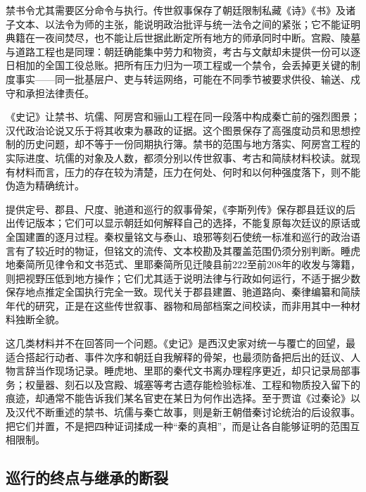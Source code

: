 禁书令尤其需要区分命令与执行。传世叙事保存了朝廷限制私藏《诗》《书》及诸子文本、以法令为师的主张，能说明政治批评与统一法令之间的紧张；它不能证明典籍在一夜间焚尽，也不能让后世据此断定所有地方的师承同时中断。宫殿、陵墓与道路工程也是同理：朝廷确能集中劳力和物资，考古与文献却未提供一份可以逐日相加的全国工役总账。把所有压力归为一项工程或一个禁令，会丢掉更关键的制度事实——同一批基层户、吏与转运网络，可能在不同季节被要求供役、输送、戍守和承担法律责任。

\begin{debate}[诏令、传说与执行]
《史记》让禁书、坑儒、阿房宫和骊山工程在同一段落中构成秦亡前的强烈图景；汉代政治论说又乐于将其收束为暴政的证据。这个图景保存了高强度动员和思想控制的历史问题，却不等于一份同期执行簿。禁书的范围与地方落实、阿房宫工程的实际进度、坑儒的对象及人数，都须分别以传世叙事、考古和简牍材料校读。就现有材料而言，压力的存在较为清楚，压力在何处、何时和以何种强度落下，则不能伪造为精确统计。
\end{debate}

\begin{sourcenote}[从皇帝诏令到县廷竹简]
提供定号、郡县、尺度、驰道和巡行的叙事骨架，《李斯列传》保存郡县廷议的后出传记版本；它们可以显示朝廷如何解释自己的选择，不能复原每次廷议的原话或全国建置的逐月过程。秦权量铭文与泰山、琅邪等刻石使统一标准和巡行的政治语言有了较近时的物证，但铭文的流传、文本校勘及其覆盖范围仍须分别判断。睡虎地秦简所见律令和文书范式、里耶秦简所见迁陵县前222至前208年的收发与簿籍，则把视野压低到地方操作；它们尤其适于说明法律与行政如何运行，不适于据少数保存地点推定全国执行完全一致。现代关于郡县建置、驰道路向、秦律编纂和简牍年代的研究，正是在这些传世叙事、器物和局部档案之间校读，而非用其中一种材料独断全貌。
\end{sourcenote}

这几类材料并不在回答同一个问题。《史记》是西汉史家对统一与覆亡的回望，最适合搭起行动者、事件次序和朝廷自我解释的骨架，也最须防备把后出的廷议、人物言辞当作现场记录。睡虎地、里耶的秦代文书离办理程序更近，却只记录局部事务；权量器、刻石以及宫殿、城塞等考古遗存能检验标准、工程和物质投入留下的痕迹，却通常不能告诉我们某名官吏在某日为何作出选择。至于贾谊《过秦论》以及汉代不断重述的禁书、坑儒与秦亡故事，则是新王朝借秦讨论统治的后设叙事。把它们并置，不是把四种证词揉成一种“秦的真相”，而是让各自能够证明的范围互相限制。

\subsection{巡行的终点与继承的断裂}

